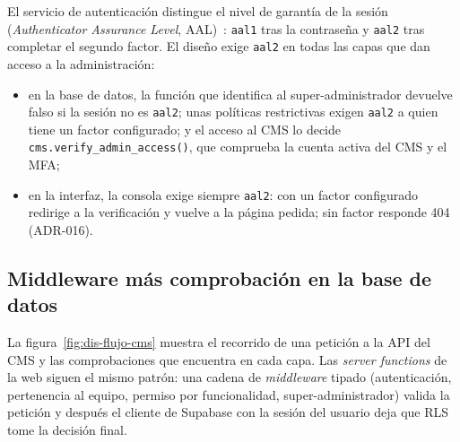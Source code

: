 El servicio de autenticación distingue el nivel de garantía de la sesión
(\textit{Authenticator Assurance Level}, AAL)~\cite{supabase-mfa}:
\texttt{aal1} tras la contraseña y \texttt{aal2} tras completar el segundo
factor. El diseño exige \texttt{aal2} en todas las capas que dan acceso a la
administración:

\begin{itemize}
  \item en la base de datos, la función que identifica al super-administrador
        devuelve falso si la sesión no es \texttt{aal2}; unas políticas
        restrictivas exigen \texttt{aal2} a quien tiene un factor
        configurado; y el acceso al CMS lo decide
        \texttt{cms.verify\_admin\_access()}, que comprueba la cuenta activa
        del CMS y el MFA;
  \item en la interfaz, la consola exige siempre \texttt{aal2}: con un factor
        configurado redirige a la verificación y vuelve a la página pedida;
        sin factor responde 404 (ADR-016).
\end{itemize}

\subsection{Middleware más comprobación en la base de datos}
\label{sec:dis-middleware}

La figura~\ref{fig:dis-flujo-cms} muestra el recorrido de una petición a la
API del CMS y las comprobaciones que encuentra en cada capa. Las
\textit{server functions} de la web siguen el mismo patrón: una cadena de
\textit{middleware} tipado (autenticación, pertenencia al equipo, permiso por
funcionalidad, super-administrador) valida la petición y después el cliente de
Supabase con la sesión del usuario deja que RLS tome la decisión final.

